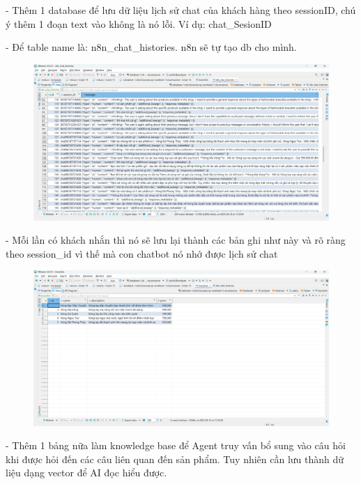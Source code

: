 - Thêm 1 database để lưu dữ liệu lịch sử chat của khách hàng theo sessionID, chú ý thêm 1 đoạn text vào không là nó lỗi. Ví dụ: chat\_SesionID

- Để table name là: n8n\_chat\_histories. n8n sẽ tự tạo db cho mình.


\begin{figure}[htbp]
    \centering
    \includegraphics[width=1\linewidth]{Chap1-7/db-data.pdf}
\end{figure}
- Mỗi lần có khách nhắn thì nó sẽ lưu lại thành các bản ghi như này và rõ ràng theo session\_id vì thế mà con chatbot nó nhớ được lịch sử chat

\begin{figure}[htbp]
    \centering
    \includegraphics[width=1\linewidth]{Chap1-7/db-data-vong.pdf}
\end{figure}

- Thêm 1 bảng nữa làm knowledge base để Agent truy vấn bổ sung vào câu hỏi khi được hỏi đến các câu liên quan đến sản phẩm. Tuy nhiên cần lưu thành dữ liệu dạng vector để AI đọc hiểu được.

